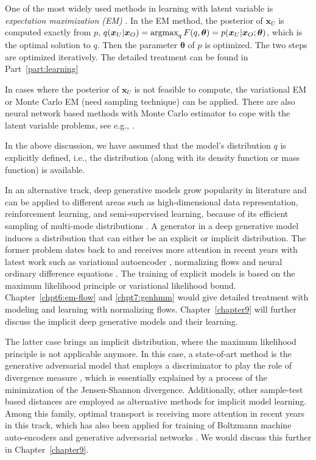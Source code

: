 One of the most widely used methods in learning with latent variable is \textit{expectation maximization (EM)} \cite{DEMP1977em}. In the EM method, the posterior of $\bm{x}_U$ is computed exactly from $p$, $q(\bm{x}_U|\bm{x}_O) = \operatorname{argmax}_{q}{F(q, \bm{\theta})} = p(\bm{x}_U|\bm{x}_O; \bm{\theta})$, which is the optimal solution to $q$. Then the parameter $\bm{\theta}$ of $p$ is optimized. The two steps are optimized iteratively. The detailed treatment can be found in Part~\ref{part:learning}

In cases where the posterior of $\bm{x}_U$ is not feasible to compute, the variational EM\cite[section~6.2.2]{wainwright2008graphical} or Monte Carlo EM (need sampling technique) \cite{neath2012convergence} can be applied. There are also neural network based methods with Monte Carlo estimator to cope with the latent variable problems, see e.g., \cite{DBLP:journals/corr/KingmaW13, kuleshov2017NVIL, lazarogredilla2019learning, goodfellow2014gan}.


In the above discussion, we have assumed that the model's distribution $q$ is explicitly defined, i.e., the distribution (along with its density function or mass function) is available. 

In an alternative track, deep generative models grow popularity in literature and can be applied to different areas such as high-dimensional data representation, reinforcement learning, and semi-supervised learning, because of its efficient sampling of multi-mode distributions \cite{2017arXiv170100160G}. A generator in a deep generative model induces a distribution that can either be an explicit or implicit distribution. The former problem dates back to \cite{deco1995high-order} and receives more attention in recent years with latest work such as variational autoencoder \cite{DBLP:journals/corr/KingmaW13}, normalizing flows \cite{2016arXiv160508803D, 2018arXiv180703039K} and neural ordinary difference equations \cite{ricky2018ODE}. The training of explicit models is based on the maximum likelihood principle or variational likelihood bound. Chapter~\ref{chpt6:em-flow} and \ref{chpt7:genhmm} would give detailed treatment with modeling and learning with normalizing flows. Chapter~\ref{chapter9} will further discuss the implicit deep generative models and their learning.

The latter case brings an implicit distribution, where the maximum likelihood principle is not applicable anymore. In this case, a state-of-art method is the generative adversarial model that employs a discriminator to play the role of divergence measure \cite{goodfellow2014gan, 2017arXiv170104862A, NIPS2016_6125}, which is essentially explained by a process of the minimization of the Jensen-Shannon divergence. Additionally, other sample-test based distances are employed as alternative methods for implicit model learning. Among this family, optimal transport is receiving more attention in recent years \cite{santambrogio2015optimal, 2013arXiv1306.0895C} in this track, which has also been applied for training of Boltzmann machine \cite{NIPS2016_6248} auto-encoders\cite{2017arXiv171101558T} and generative adversarial networks \cite{2017arXiv170107875A}. We would discuss this further in Chapter~\ref{chapter9}.



